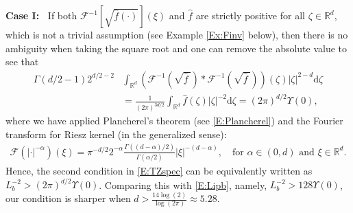 \documentclass[12pt]{report}
\theoremstyle{plain}
\theoremstyle{definition}
\numberwithin{equation}{section}
\newcommand{\R}{\mathbb{R}}
\newcommand{\ud}{\ensuremath{ \mathrm{d} }}
\begin{document}
{\bf\noindent Case I:~} If both $\mathcal{F}^{-1}\left[\sqrt{\widehat{f}(\cdot)}\right](\xi)$ and $\widehat{f}$ are strictly positive for all $\zeta\in\R^d$, which is not a trivial assumption (see Example \ref{Ex:Finv} below), then
there is no ambiguity when taking the square root and one can remove the absolute value to see
that
\begin{align*}
\Gamma(d/2 -1)2^{d/2-2} & \int_{\R^d} \left(\mathcal{F}^{-1}\left(\sqrt{ \widehat{f}\: }\right) * \mathcal{F}^{-1}\left(\sqrt{ \widehat{f}\: }\right)\right) (\zeta) |\zeta|^{2-d} \ud \zeta \\
& = \frac{1}{(2\pi)^{3d/2}} \int_{\R^d} \widehat{f}(\zeta)  |\zeta|^{-2} \ud \zeta
= \left(2\pi\right)^{d/2}\Upsilon(0),
\end{align*}
where we have applied Plancherel's theorem (see \eqref{E:Plancherel}) and the Fourier transform
for Riesz kernel (in the generalized sense):
\begin{align*}
\mathcal{F}(|\cdot|^{-\alpha})(\xi) = \pi^{-d /2} 2^{-\alpha} \frac{\Gamma\left((d-\alpha)/2\right)}{\Gamma(\alpha /2)} |\xi|^{-(d-\alpha)},
\quad \text{for $\alpha\in(0,d)$ and $\xi\in\R^d$}.
\end{align*}
Hence, the second condition in \eqref{E:TZspec} can be equivalently written as $L_b^{-2}>
(2\pi)^{d/2}\Upsilon(0)$. Comparing this with \eqref{E:Lipb}, namely, $L_b^{-2}> 128 \Upsilon(0)$,
our condition is sharper when $d> \frac{14\log(2)}{\log(2\pi)} \approx 5.28$. 
\end{document}
